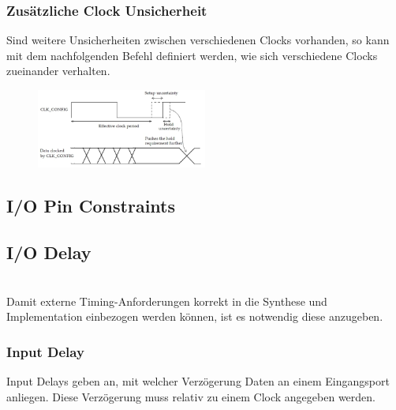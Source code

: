 \begin{multicols}{2}
    \subsubsection{Zusätzliche Clock Unsicherheit}
    Sind weitere Unsicherheiten zwischen verschiedenen Clocks vorhanden, so kann mit dem nachfolgenden Befehl definiert werden, wie sich verschiedene Clocks zueinander verhalten.
    
    \begin{figure}[H]
        \includegraphics[width=0.5\textwidth]{images/clock_uncertainty.png}
    \end{figure}
\end{multicols}

\subsection{I/O Pin Constraints}


\subsection{I/O Delay}$~$ \\
Damit externe Timing-Anforderungen korrekt in die Synthese und Implementation einbezogen werden können, ist es notwendig diese anzugeben.

\subsubsection{Input Delay} \label{chapter:input_delay}
Input Delays geben an, mit welcher Verzögerung Daten an einem Eingangsport anliegen. Diese Verzögerung muss relativ zu einem Clock angegeben werden.

